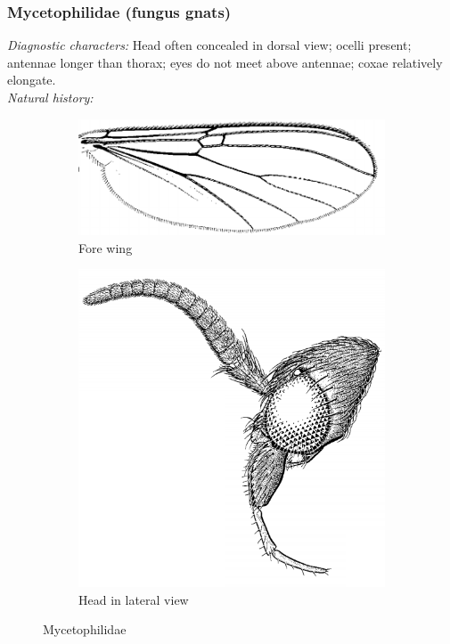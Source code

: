 \documentclass[letterpaper, 11pt]{article}
\begin{document}
\subsubsection{Mycetophilidae (fungus gnats)}
\noindent{}\textit{Diagnostic characters:} Head often concealed in dorsal view; ocelli present; antennae longer than thorax; eyes do not meet above antennae; coxae relatively elongate.\\

\noindent{}\textit{Natural history:} \\

\begin{figure}[ht!]
    \centering
    \begin{subfigure}[ht!]{0.45\textwidth}
        \includegraphics[width=\textwidth]{MycetophilidWing}
        \caption{Fore wing \citep[][Fig. 14.24]{mcalpine1981manual}}
        \label{fig:mycetophilid1}
    \end{subfigure}
    \qquad
    \begin{subfigure}[ht!]{0.27\textwidth}
        \includegraphics[width=\textwidth]{MycetophilidHead}
        \caption{Head in lateral view \citep[][Fig. 13.1]{mcalpine1981manual}}
        \label{fig:mycetophilid2}
    \end{subfigure}
    \caption{Mycetophilidae}\label{fig:mycetophilids}
\end{figure}
\end{document}
